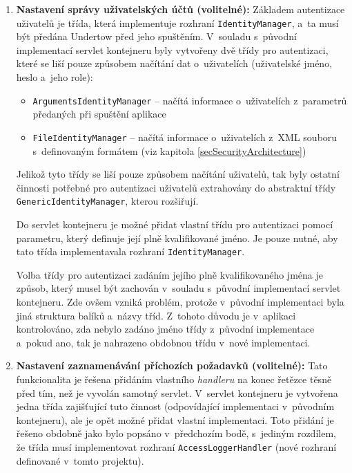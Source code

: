 \begin{enumerate}
                \item \textbf{Nastavení správy uživatelských účtů (volitelné):} Základem autentizace
                    uživatelů je třída, která implementuje rozhraní \texttt{IdentityManager}, a~ta musí
                    být předána Undertow před jeho spuštěním. 
                    V~souladu s~původní implementací servlet kontejneru byly vytvořeny dvě třídy pro autentizaci, které
                    se liší pouze způsobem načítání dat o~uživatelích (uživatelské jméno, heslo a~jeho role):
                    \begin{itemize}
                        \item \texttt{ArgumentsIdentityManager} -- načítá informace o~uživatelích z~parametrů předaných
                            při spuštění aplikace
                        \item \texttt{FileIdentityManager} -- načítá informace o~uživatelích z~XML souboru s~definovaným formátem 
                            (viz kapitola \ref{secSecurityArchitecture})
                    \end{itemize}

                    Jelikož tyto třídy se liší pouze způsobem načítání uživatelů, tak byly ostatní činnosti potřebné pro
                    autentizaci uživatelů extrahovány 
                    do abstraktní třídy \\\texttt{GenericIdentityManager}, kterou rozšiřují.
                        
                    Do servlet kontejneru je možné přidat vlastní třídu pro autentizaci pomocí parametru,
                    který definuje její plně kvalifikované jméno. Je pouze nutné, aby tato třída implementavala
                    rozhraní \texttt{IdentityManager}.

                    Volba třídy pro autentizaci zadáním jejího plně kvalifikovaného jména
                    je způsob, který musel být zachován v~souladu s~původní implementací servlet kontejneru. 
                    Zde ovšem vzniká problém, protože v~původní implementaci byla jiná struktura balíků
                    a~názvy tříd. Z~tohoto důvodu je v~aplikaci kontrolováno, zda nebylo zadáno
                    jméno třídy z~původní implementace a~pokud ano, tak je 
                    nahrazeno obdobnou třídu v~nové implementaci.
                
                \item \textbf{Nastavení zaznamenávání příchozích požadavků (volitelné):}
                     Tato funkcionalita je řešena přidáním vlastního \emph{handleru} na konec řetězce
                     těsně před tím, než je vyvolán samotný servlet. V~servlet kontejneru je 
                     vytvořena jedna třída zajišťující tuto činnost (odpovídající implementaci v~původním
                     kontejneru), ale je opět možné přidat vlastní implementaci. Toto přidání
                     je řešeno obdobně jako bylo popsáno v~předchozím bodě, s~jediným
                     rozdílem, že 
                     třída musí implementovat rozhraní \texttt{AccessLoggerHandler} (nové
                     rozhraní definované v~tomto projektu).
                     

\end{enumerate}
